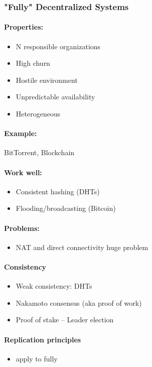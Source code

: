 \subsubsection{"Fully" Decentralized Systems}
\paragraph{Properties:}
\begin{itemize}
    \item N responsible organizations
    \item High churn
    \item Hostile environment
    \item Unpredictable availability
    \item Heterogeneous
\end{itemize}
\paragraph{Example:}
BitTorrent, Blockchain
\paragraph{Work well:} 
\begin{itemize}
    \item Consistent hashing (DHTs)
    \item Flooding/broadcasting (Bitcoin)
\end{itemize}
\paragraph{Problems:} 
\begin{itemize}
    \item NAT and direct connectivity huge problem
\end{itemize}
\paragraph{Consistency}
\begin{itemize}
    \item Weak consistency: DHTs
    \item Nakamoto consensus (aka proof of work)
    \item Proof of stake – Leader election
\end{itemize}
\paragraph{Replication principles}
\begin{itemize}
    \item apply to fully
\end{itemize}

